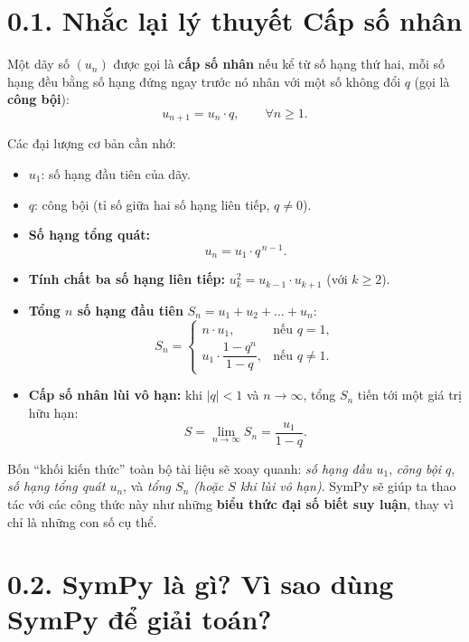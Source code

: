 \documentclass[12pt,a4paper]{report}
\begin{document}
\section*{0.1. Nhắc lại lý thuyết Cấp số nhân}

Một dãy số $(u_n)$ được gọi là \textbf{cấp số nhân} nếu kể từ số hạng
thứ hai, mỗi số hạng đều bằng số hạng đứng ngay trước nó nhân với một
số không đổi $q$ (gọi là \textbf{công bội}):
\[
u_{n+1} = u_n \cdot q, \qquad \forall n \geq 1.
\]

Các đại lượng cơ bản cần nhớ:

\begin{itemize}
  \item $u_1$: số hạng đầu tiên của dãy.
  \item $q$: công bội (tỉ số giữa hai số hạng liên tiếp, $q \neq 0$).
  \item \textbf{Số hạng tổng quát:}
  \[
  u_n = u_1 \cdot q^{\,n-1}.
  \]
  \item \textbf{Tính chất ba số hạng liên tiếp:}
  $u_k^2 = u_{k-1} \cdot u_{k+1}$ (với $k \geq 2$).
  \item \textbf{Tổng $n$ số hạng đầu tiên} $S_n = u_1 + u_2 + \dots + u_n$:
  \[
  S_n =
  \begin{cases}
    n \cdot u_1, & \text{nếu } q = 1,\\[4pt]
    u_1 \cdot \dfrac{1 - q^n}{1 - q}, & \text{nếu } q \neq 1.
  \end{cases}
  \]
  \item \textbf{Cấp số nhân lùi vô hạn:} khi $|q| < 1$ và $n \to \infty$,
  tổng $S_n$ tiến tới một giá trị hữu hạn:
  \[
  S = \lim_{n \to \infty} S_n = \frac{u_1}{1 - q}.
  \]
\end{itemize}

\begin{infobox}
Bốn ``khối kiến thức'' toàn bộ tài liệu sẽ xoay quanh: \emph{số hạng đầu
$u_1$}, \emph{công bội $q$}, \emph{số hạng tổng quát $u_n$}, và
\emph{tổng $S_n$ (hoặc $S$ khi lùi vô hạn)}. SymPy sẽ giúp ta thao tác
với các công thức này như những \textbf{biểu thức đại số biết suy luận},
thay vì chỉ là những con số cụ thể.
\end{infobox}

\section*{0.2. SymPy là gì? Vì sao dùng SymPy để giải toán?}
\end{document}
